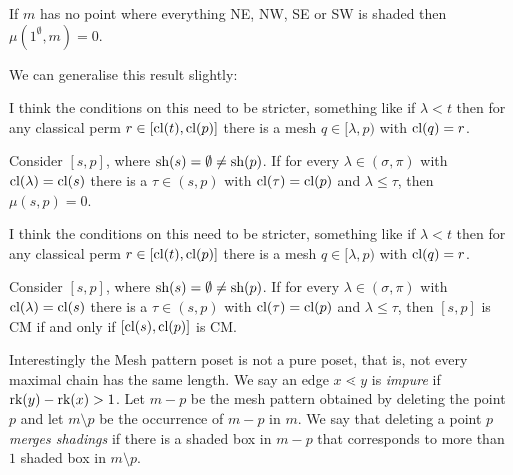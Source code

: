 \documentclass[11pt,a4paper,oneside]{article}
\begin{document}
\begin{cor}
If $m$ has no point where everything NE, NW, SE or SW is shaded then $\mu(1^\emptyset,m)=0$.
\end{cor}

We can generalise this result slightly:
\begin{lem}I think the conditions on this need to be stricter, something like if $\lambda<t$ then for any classical perm $r\in[\operatorname{\textrm{cl}}(t),\operatorname{\textrm{cl}}(p)]$ there is a mesh $q\in[\lambda,p)$ with $\operatorname{\textrm{cl}}(q)=r$.

Consider $[s,p]$, where $\operatorname{\textrm{sh}}(s)=\emptyset\not=\operatorname{\textrm{sh}}(p)$. If for every $\lambda\in(\sigma,\pi)$ with $\operatorname{\textrm{cl}}(\lambda)=\operatorname{\textrm{cl}}(s)$ there is a $\tau\in(s,p)$ with $\operatorname{\textrm{cl}}(\tau)=\operatorname{\textrm{cl}}(p)$ and $\lambda\le\tau$, then $\mu(s,p)=0$.
\end{lem}

\begin{lem}I think the conditions on this need to be stricter, something like if $\lambda<t$ then for any classical perm $r\in[\operatorname{\textrm{cl}}(t),\operatorname{\textrm{cl}}(p)]$ there is a mesh $q\in[\lambda,p)$ with $\operatorname{\textrm{cl}}(q)=r$.

Consider $[s,p]$, where $\operatorname{\textrm{sh}}(s)=\emptyset\not=\operatorname{\textrm{sh}}(p)$. If for every $\lambda\in(\sigma,\pi)$ with $\operatorname{\textrm{cl}}(\lambda)=\operatorname{\textrm{cl}}(s)$ there is a $\tau\in(s,p)$ with $\operatorname{\textrm{cl}}(\tau)=\operatorname{\textrm{cl}}(p)$ and $\lambda\le\tau$, then $[s,p]$ is CM if and only if $[\operatorname{\textrm{cl}}(s),\operatorname{\textrm{cl}}(p)]$ is CM.
\end{lem}

Interestingly the Mesh pattern poset is not a pure poset, that is, not every maximal chain has the same length. We say an edge $x\lessdot y$ is \emph{impure} if $\operatorname{\textrm{rk}}(y)-\operatorname{\textrm{rk}}(x)>1$. Let $m-p$ be the mesh pattern obtained by deleting the point $p$ and let $m\setminus p$ be the occurrence of $m-p$ in $m$. We say that deleting a point $p$ \emph{merges shadings} if there is a shaded box in $m-p$ that corresponds to more than $1$ shaded box in $m\setminus p$.
\end{document}
